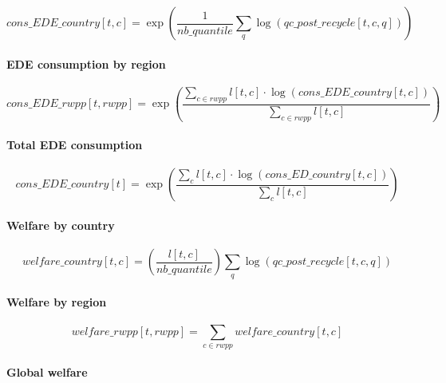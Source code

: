 \documentclass[
]{article}
\begin{document}
\begin{equation}
  cons\_EDE\_country[t,c] = \exp \left( \frac{1}{nb\_quantile} \sum_q \log(qc\_post\_recycle[t,c,q]) \right)
\end{equation}

\paragraph{EDE consumption by
region}\label{ede-consumption-by-region-1}

\begin{equation}
  cons\_EDE\_rwpp[t,rwpp] = \exp \left( \frac{\sum_{c \in rwpp} l[t,c] \cdot \log(cons\_EDE\_country[t,c])}{\sum_{c \in rwpp} l[t,c]} \right)
\end{equation}

\paragraph{Total EDE consumption}\label{total-ede-consumption}

\begin{equation}
  cons\_EDE\_country[t] = \exp\left( \frac{\sum_c l[t,c] \cdot \log(cons\_ED\_country[t,c])}{\sum_c l[t,c]} \right)
\end{equation}

\paragraph{Welfare by country}\label{welfare-by-country-1}

\begin{equation}
  welfare\_country[t,c] = \left( \frac{l[t,c]}{nb\_quantile} \right) \sum_q \log(qc\_post\_recycle[t,c,q])
\end{equation}

\paragraph{Welfare by region}\label{welfare-by-region-1}

\begin{equation}
  welfare\_rwpp[t,rwpp] = \sum_{c \in rwpp}welfare\_country[t,c]
\end{equation}

\paragraph{Global welfare}\label{global-welfare-1}
\end{document}
